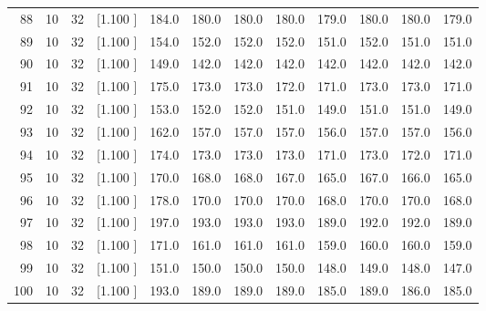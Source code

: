 \documentclass[12pt,a4paper]{article}
\begin{document}
\begin{center}
{\begin{tabular}{r r r r r r r r r r r r}
  88& 10& 32&[1.100     ]&   184.0&   180.0&   180.0&   180.0&   179.0&   180.0&   180.0&   179.0\\[-0.02in]
  89& 10& 32&[1.100     ]&   154.0&   152.0&   152.0&   152.0&   151.0&   152.0&   151.0&   151.0\\[-0.02in]
  90& 10& 32&[1.100     ]&   149.0&   142.0&   142.0&   142.0&   142.0&   142.0&   142.0&   142.0\\[-0.02in]
  91& 10& 32&[1.100     ]&   175.0&   173.0&   173.0&   172.0&   171.0&   173.0&   173.0&   171.0\\[-0.02in]
  92& 10& 32&[1.100     ]&   153.0&   152.0&   152.0&   151.0&   149.0&   151.0&   151.0&   149.0\\[-0.02in]
  93& 10& 32&[1.100     ]&   162.0&   157.0&   157.0&   157.0&   156.0&   157.0&   157.0&   156.0\\[-0.02in]
  94& 10& 32&[1.100     ]&   174.0&   173.0&   173.0&   173.0&   171.0&   173.0&   172.0&   171.0\\[-0.02in]
  95& 10& 32&[1.100     ]&   170.0&   168.0&   168.0&   167.0&   165.0&   167.0&   166.0&   165.0\\[-0.02in]
  96& 10& 32&[1.100     ]&   178.0&   170.0&   170.0&   170.0&   168.0&   170.0&   170.0&   168.0\\[-0.02in]
  97& 10& 32&[1.100     ]&   197.0&   193.0&   193.0&   193.0&   189.0&   192.0&   192.0&   189.0\\[-0.02in]
  98& 10& 32&[1.100     ]&   171.0&   161.0&   161.0&   161.0&   159.0&   160.0&   160.0&   159.0\\[-0.02in]
  99& 10& 32&[1.100     ]&   151.0&   150.0&   150.0&   150.0&   148.0&   149.0&   148.0&   147.0\\[-0.02in]
 100& 10& 32&[1.100     ]&   193.0&   189.0&   189.0&   189.0&   185.0&   189.0&   186.0&   185.0\\[-0.02in]

\hline
\end{tabular}}
\end{center}
\end{document}
